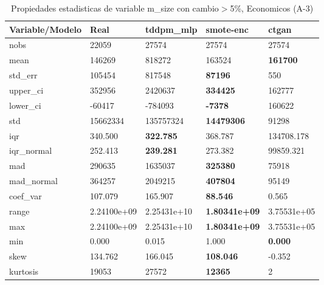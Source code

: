 \begin{table}[H]
\centering
\fontsize{8}{14}\selectfont
\caption{Propiedades estadisticas de variable m\_size con cambio\ensuremath{>}5\%, Economicos (A-3)}
\label{table-stats-economicos-a-3-m_size-short}
\begin{tabular}{|l|m{10em}|m{10em}|m{10em}|m{10em}|}
\hline
 \rowcolor[gray]{0.8}
Variable/Modelo & Real & tddpm\_mlp & smote-enc & ctgan \\
\hline nobs & 22059 & 27574 & 27574 & 27574 \\
\hline mean & 146269 & \cellcolor[rgb]{0.9, 0.54, 0.52} 818272 & 163524 & \bfseries 161700 \\
\hline std\_err & 105454 & \cellcolor[rgb]{0.9, 0.54, 0.52} 817548 & \bfseries 87196 & 550 \\
\hline upper\_ci & 352956 & \cellcolor[rgb]{0.9, 0.54, 0.52} 2420637 & \bfseries 334425 & 162777 \\
\hline lower\_ci & -60417 & \cellcolor[rgb]{0.9, 0.54, 0.52} -784093 & \bfseries -7378 & 160622 \\
\hline std & 15662334 & \cellcolor[rgb]{0.9, 0.54, 0.52} 135757324 & \bfseries 14479306 & 91298 \\
\hline iqr & 340.500 & \bfseries 322.785 & 368.787 & \cellcolor[rgb]{0.9, 0.54, 0.52} 134708.178 \\
\hline iqr\_normal & 252.413 & \bfseries 239.281 & 273.382 & \cellcolor[rgb]{0.9, 0.54, 0.52} 99859.321 \\
\hline mad & 290635 & \cellcolor[rgb]{0.9, 0.54, 0.52} 1635037 & \bfseries 325380 & 75918 \\
\hline mad\_normal & 364257 & \cellcolor[rgb]{0.9, 0.54, 0.52} 2049215 & \bfseries 407804 & 95149 \\
\hline coef\_var & 107.079 & 165.907 & \bfseries 88.546 & \cellcolor[rgb]{0.9, 0.54, 0.52} 0.565 \\
\hline range & 2.24100e+09 & \cellcolor[rgb]{0.9, 0.54, 0.52} 2.25431e+10 & \bfseries 1.80341e+09 & 3.75531e+05 \\
\hline max & 2.24100e+09 & \cellcolor[rgb]{0.9, 0.54, 0.52} 2.25431e+10 & \bfseries 1.80341e+09 & 3.75531e+05 \\
\hline min & 0.000 & 0.015 & \cellcolor[rgb]{0.9, 0.54, 0.52} 1.000 & \bfseries 0.000 \\
\hline skew & 134.762 & 166.045 & \bfseries 108.046 & \cellcolor[rgb]{0.9, 0.54, 0.52} -0.352 \\
\hline kurtosis & 19053 & 27572 & \bfseries 12365 & \cellcolor[rgb]{0.9, 0.54, 0.52} 2 \\

\end{tabular}
\end{table}
